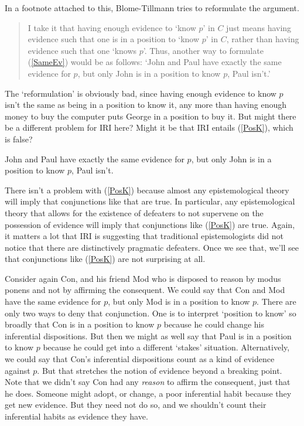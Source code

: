 \documentclass[oneside, a4paper]{book}
\renewcommand{\numbex}[2]{
\begin{enumerate*}
\setcounter{enumi}{\value{paper}}
\renewcommand{\labelenumi}{(\arabic{enumi})}
#2
\end{enumerate*}
\addtocounter{paper}{#1}}
\begin{document}
In a footnote attached to this, Blome-Tillmann tries to reformulate the argument.

\begin{quote}
\noindent I take it that having enough evidence to `know $p$' in $C$ just means having evidence such that one is in a position to `know $p$' in $C$, rather than having evidence such that one `knows $p$'. Thus, another way to formulate (\ref{SameEv}) would be as follows: `John and Paul have exactly the same evidence for $p$, but only John is in a position to know $p$, Paul isn't.' \cite[329n23]{MBT2009}
\end{quote}

\noindent The `reformulation' is obviously bad, since having enough evidence to know $p$ isn't the same as being in a position to know it, any more than having enough money to buy the computer puts George in a position to buy it. But might there be a different problem for IRI here? Might it be that IRI entails (\ref{PosK}), which is false?

\numbex{1}{
\item \label{PosK} John and Paul have exactly the same evidence for $p$, but only John is in a position to know $p$, Paul isn't.}

\noindent There isn't a problem with (\ref{PosK}) because almost any epistemological theory will imply that conjunctions like that are true. In particular, any epistemological theory that allows for the existence of defeaters to not supervene on the possession of evidence will imply that conjunctions like (\ref{PosK}) are true. Again, it matters a lot that IRI is suggesting that traditional epistemologists did not notice that there are distinctively pragmatic defeaters. Once we see that, we'll see that conjunctions like (\ref{PosK}) are not surprising at all.

Consider again Con, and his friend Mod who is disposed to reason by modus ponens and not by affirming the consequent. We could say that Con and Mod have the same evidence for $p$, but only Mod is in a position to know $p$. There are only two ways to deny that conjunction. One is to interpret `position to know' so broadly that Con is in a position to know $p$ because he could change his inferential dispositions. But then we might as well say that Paul is in a position to know $p$ because he could get into a different `stakes' situation. Alternatively, we could say that Con's inferential dispositions count as a kind of evidence against $p$. But that stretches the notion of evidence beyond a breaking point. Note that we didn't say Con had any \textit{reason} to affirm the consequent, just that he does. Someone might adopt, or change, a poor inferential habit because they get new evidence. But they need not do so, and we shouldn't count their inferential habits as evidence they have.
\end{document}

